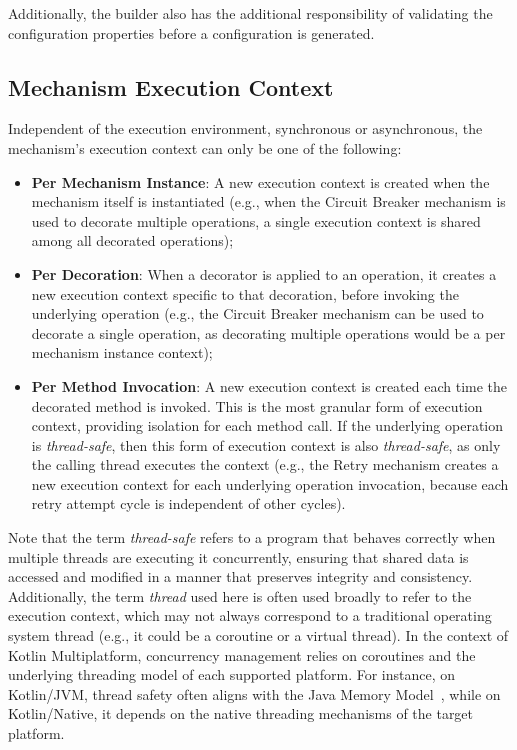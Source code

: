 Additionally, the builder also has the additional responsibility of validating the configuration properties before a configuration is generated.

\subsection{Mechanism Execution Context}\label{subsec:mechanism-execution-context}

Independent of the execution environment, synchronous or asynchronous, the mechanism's execution context can only be one of the following:

\begin{itemize}
    \item \textbf{Per Mechanism Instance}: A new execution context is created when the mechanism itself is instantiated (e.g., when the Circuit Breaker mechanism is used to decorate multiple operations, a single execution context is shared among all decorated operations);
    \item \textbf{Per Decoration}: When a decorator is applied to an operation, it creates a new execution context specific to that decoration, before invoking the underlying operation (e.g., the Circuit Breaker mechanism can be used to decorate a single operation, as decorating multiple operations would be a per mechanism instance context);
    \item \textbf{Per Method Invocation}: A new execution context is created each time the decorated method is invoked.
    This is the most granular form of execution context, providing isolation for each method call.
    If the underlying operation is \textit{thread-safe}, then this form of execution context is also \textit{thread-safe},
    as only the calling thread executes the context
    (e.g., the Retry mechanism creates a new execution context for each underlying operation invocation,
    because each retry attempt cycle is independent of other cycles).
\end{itemize}

Note that the term \textit{thread-safe} refers to a program
that behaves correctly when multiple threads are executing it concurrently,
ensuring that shared data is accessed and modified in a manner that preserves integrity and consistency.
Additionally, the term \textit{thread} used here is often used broadly to refer to the execution context, which may not always correspond to a traditional operating system thread (e.g., it could be a coroutine or a virtual thread).
In the context of Kotlin Multiplatform,
concurrency management relies on coroutines and the underlying threading model of each supported platform.
For instance, on Kotlin/JVM, thread safety often aligns with the Java Memory Model~\cite{java-memory-model},
while on Kotlin/Native, it depends on the native threading mechanisms of the target platform.


